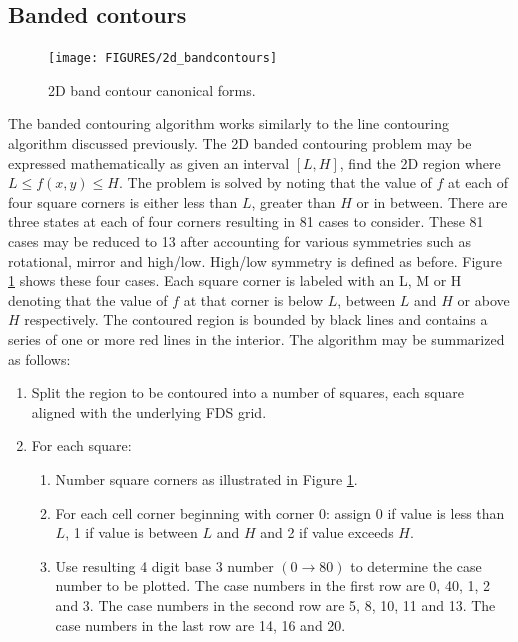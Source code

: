 \documentclass[11pt,twoside]{book}
\begin{document}
\subsection{Banded contours}
\begin{figure}[\figoptions]
\begin{center}
\texttt{[image: FIGURES/2d\_bandcontours]}
\end{center}
\caption{2D band contour canonical forms.
  }
\label{fig2dband}%
\end{figure}
The banded contouring algorithm works similarly to the line
contouring algorithm discussed previously.  The 2D banded
contouring problem may be expressed mathematically as given an
interval $[L,H]$, find the 2D region where $L\le f(x,y)\le H$. The
problem is solved by noting that the value of $f$ at each of four
square corners is either less than $L$, greater than $H$ or in
between.  There are three states at each of four corners resulting
in 81 cases to consider.  These 81 cases may be reduced to 13
after accounting for various symmetries such as rotational, mirror
and high/low. High/low symmetry is defined as before. Figure
\ref{fig2dband} shows these four cases.  Each square corner is
labeled with an L, M or H denoting that the value of $f$ at that
corner is below $L$, between $L$  and $H$ or above $H$
respectively.  The contoured region is bounded by black lines and
contains a series of one or more red lines in the interior. The
algorithm may be summarized as follows:
\begin{enumerate}
\item Split the region to be contoured into a number of squares, each square aligned with the underlying FDS grid.
\item For  each square:
\begin{enumerate}
\item Number square corners as illustrated in Figure \ref{fig2dband}.
\item For each cell corner beginning with corner 0: assign 0 if value is less than $L$, 1 if value is between $L$ and $H$ and 2 if value exceeds $H$.
\item Use resulting 4 digit base 3 number $(0\rightarrow 80)$ to determine the case number to be plotted.
The case numbers in the first row are 0, 40, 1, 2 and 3.  The case numbers in the second row are 5, 8, 10, 11 and 13.  The case numbers in the last row are 14, 16 and 20.
\end{enumerate}
\end{enumerate}
\end{document}
